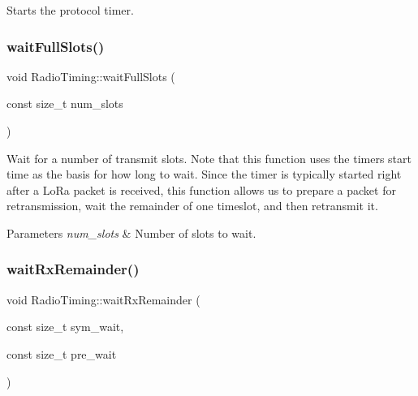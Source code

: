 Starts the protocol timer. \mbox{\label{classRadioTiming_a5968dcc1c5dc7aa644e4fd4b3c44f373}} 
\subsubsection{\texorpdfstring{wait\+Full\+Slots()}{waitFullSlots()}}
{\footnotesize\ttfamily void Radio\+Timing\+::wait\+Full\+Slots (\begin{DoxyParamCaption}\item[{const size\+\_\+t}]{num\+\_\+slots }\end{DoxyParamCaption})}

Wait for a number of transmit slots. Note that this function uses the timer\textquotesingle{}s start time as the basis for how long to wait. Since the timer is typically started right after a Lo\+Ra packet is received, this function allows us to prepare a packet for retransmission, wait the remainder of one timeslot, and then retransmit it. 
\begin{DoxyParams}{Parameters}
{\em num\+\_\+slots} & Number of slots to wait. \\
\hline
\end{DoxyParams}
\mbox{\label{classRadioTiming_ab794bed8927778ed17a9cbbfe1cf4a5f}} 
\subsubsection{\texorpdfstring{wait\+Rx\+Remainder()}{waitRxRemainder()}}
{\footnotesize\ttfamily void Radio\+Timing\+::wait\+Rx\+Remainder (\begin{DoxyParamCaption}\item[{const size\+\_\+t}]{sym\+\_\+wait,  }\item[{const size\+\_\+t}]{pre\+\_\+wait }\end{DoxyParamCaption})}

